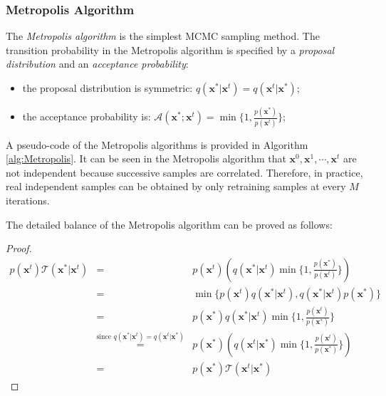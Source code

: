 \subsubsection{Metropolis Algorithm}
The \emph{Metropolis algorithm} is the simplest MCMC sampling method. The transition probability in the Metropolis algorithm is specified by a \emph{proposal distribution} and 
an \emph{acceptance probability}:
\begin{itemize}
	\item the proposal distribution is symmetric: $q(\mathbf{x}^*|\mathbf{x}^t)=q(\mathbf{x}^t|\mathbf{x}^*)$;
	\item the acceptance probability is: $\mathcal{A}(\mathbf{x}^*;\mathbf{x}^t) = \min\{1, \frac{p(\mathbf{x}^*)}{p(\mathbf{x}^t)}\}$; 
\end{itemize}
A pseudo-code of the Metropolis algorithms is provided in Algorithm \ref{alg:Metropolis}.  
It can be seen in the Metropolis algorithm that  $\mathbf{x}^0,\mathbf{x}^1,\cdots, \mathbf{x}^t$ are not independent because successive samples are correlated. Therefore, in practice, real independent 
samples can be obtained by only retraining samples at every $M$ iterations. 
    

The detailed balance of the Metropolis algorithm can be proved as follows:
\begin{proof}
	\begin{equation}
		\begin{array}{rcl}
			p(\mathbf{x}^t)\mathcal{T}(\mathbf{x}^*|\mathbf{x}^t)&=&p(\mathbf{x}^t)\left(q(\mathbf{x}^*|\mathbf{x}^t)\min\{1,\frac{p(\mathbf{x}^*)}{p(\mathbf{x}^t)}\}\right) \\
												       &=& \min\{p(\mathbf{x}^t)q(\mathbf{x}^*|\mathbf{x}^t),q(\mathbf{x}^*|\mathbf{x}^t)p(\mathbf{x}^*) \}  \\
			                                           &=&p(\mathbf{x}^*)q(\mathbf{x}^*|\mathbf{x}^t)\min\{1,\frac{p(\mathbf{x}^t)}{p(\mathbf{x}^*)}\} \\
																											 &\overset{\text{since } q(\mathbf{x}^*|\mathbf{x}^t)=q(\mathbf{x}^t|\mathbf{x}^*)}=& p(\mathbf{x}^*)\left(q(\mathbf{x}^t|\mathbf{x}^*) \min\{1,\frac{p(\mathbf{x}^t)}{p(\mathbf{x}^*)}\} \right) \\
																									&=& p(\mathbf{x}^*)\mathcal{T}(\mathbf{x}^t|\mathbf{x}^*)
	   \end{array}
	\end{equation}
\end{proof}

